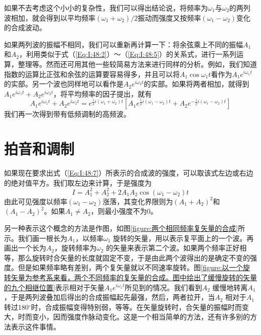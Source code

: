如果不去考虑这个小小的复杂性，我们可以得出结论说，将频率为$\omega_1$与$\omega_2$的两列波相加，就会得到以平均频率$(\omega_1 +\omega_2)/2$振动而强度又按频率$(\omega_1 -\omega_2)$变化的合成波动。

如果两列波的振幅不相同，我们可以重新再计算一下：将余弦乘上不同的振幅$A_1$和$A_2$，利用类似于式（\ref{Eq:I:48:2}）～（\ref{Eq:I:48:5}）的关系式，进行一系列运算，整理等。然而还可用其他一些较简易方法来进行同样的分析。例如，我们知道指数的运算比正弦和余弦的运算要容易得多，并且可以将$A_1\cos\omega_1 t$看作为$A_1e^{i\omega_1 t}$的实部。另一个波也同样地可以看作是$A_2e^{i\omega_2 t}$的实部。如果将两者相加，就得到$A_1e^{i\omega_1 t}+A_2e^{i\omega_2 t}$，将平均频率的因子提出，就有
\begin{equation}
    \label{Eq:I:48:7}
    A_1e^{i\omega_1 t}+A_2e^{i\omega_2 t} = e^{\frac{1}{2}i(\omega_1+\omega_2)t}\left[A_1e^{\frac{1}{2}i(\omega_1-\omega_2)t}+A_2e^{-\frac{1}{2}i(\omega_1-\omega_2)t}\right]
\end{equation}
我们再一次得到带有低频调制的高频波。

\section{拍音和调制}

如果现在要求出式（\ref{Eq:I:48:7}）所表示的合成波的强度，可以取该式左边或右边的绝对值平方。我们取左边来计算，于是强度为
\begin{equation}
    \label{Eq:I:48:8}
    I=A_1^2 + A_2^2 + 2A_1A_2\cos(\omega_1-\omega_2)t
\end{equation}
由此可见强度以频率$(\omega_1 - \omega_2)$涨落，其变化界限则为$(A_1 +A_2)^2$和$(A_1 -A_2)^2$。如果$A_1 \neq A_2$，则最小强度不为0。

另一种表示这个概念的方法是作图，如图\ref{figure:两个相同频率复矢量的合成}所示。我们画一根长为$A_1$，以频率$\omega_1$ 旋转的矢量，用以表示复平面上的一个波。再画出一个长为$A_2$，旋转频率为$\omega_2$ 的矢量来表示第二个波。如果两个频率正好相等，那么旋转时合矢量的长度就固定不变，于是由此两个波得出的是确定不变的强度。但是如果频率略有差别，两个复矢量就以不同速率旋转。图\ref{figure:以一个旋转矢量为参考系来看，两个不同频率的复矢量的合成。图中绘出了缓慢旋转的矢量的九个相继位置}表示相对于矢量$A_1e^{i\omega_1t}$所见到的情况。我们看到$A_2$ 缓慢地转离$A_1$，于是两列波叠加后得出的合成振幅起先最强，然后，两者拉开，当$A_2$ 相对于$A_1$ 转过180$^\circ$时，合成振幅变得特别弱，等等。在矢量旋转时，合矢量的振幅时而变大，时而变小，因而强度作脉动变化。这是一个相当简单的方法，还有许多别的方法表示这件事情。

